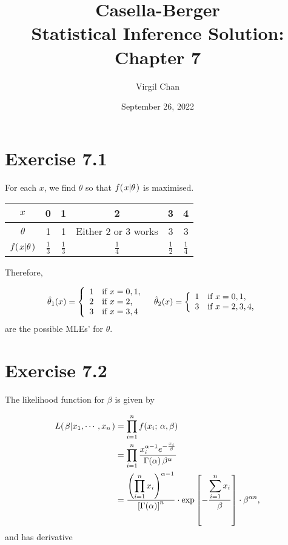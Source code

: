 \documentclass[12pt,letterpaper,reqno]{amsart}
\author{Virgil Chan}
\title{Casella-Berger \\ Statistical Inference Solution: \\ Chapter 7}
\date{September 26, 2022}
\numberwithin{equation}{subsection}
\begin{document}
\maketitle

\tableofcontents

\newpage
\section{Exercise 7.1}

For each $x$, we find $\theta$ so that ${f}\! \left( {\left. {x} \middle| {\theta} \right.} \right)$ is maximised.

\begin{center}
    \begin{tabular}{|c||c|c|c|c|c|}
    \hline
         $x$ & 0 & 1 & 2 & 3 & 4  \\
    \hline
         $\theta$ & 1 & 1 & Either 2 or 3 works & 3 & 3 \\
    \hline
    ${f}\! \left( {\left. {x} \middle| {\theta} \right.} \right)$ & $\frac{1}{3}$ & $\frac{1}{3}$ & $\frac{1}{4}$ & $\frac{1}{2}$ & $\frac{1}{4}$ \\
    \hline
    \end{tabular}
\end{center}
Therefore,

\begin{align*}
    {\hat{\theta}_1}\! \left( {x} \right) &= \left\{ \begin{array}{cl}
        1 & \mbox{if $x = 0, 1$,}\\
        2 & \mbox{if $x = 2$,} \\
        3 & \mbox{if $x =3,4$}
    \end{array} \right.
    & {\hat{\theta}_2}\! \left( {x} \right) &= \left\{ \begin{array}{cl}
        1 & \mbox{if $x = 0, 1$,}\\
        3 & \mbox{if $x =2, 3, 4$,} \\
    \end{array} \right.
\end{align*}
are the possible MLEs' for $\theta$.

\newpage
\section{Exercise 7.2}

The likelihood function for $\beta$ is given by

\begin{align*}
    {L}\! \left( {\left. {\beta} \middle| {x_1, \cdots, x_n} \right.} \right) &= \prod_{i=1}^n {f}\! \left( {x_i \mbox{; } \alpha, \beta} \right) \\
    &= \prod_{i=1}^n \frac{x_i^{\alpha - 1} e^{- \frac{x_i}{\beta}}}{{\Gamma}\! \left( {\alpha} \right) \beta^{\alpha}} \\
    &= \frac{\displaystyle \left( \prod_{i=1}^n x_i \right)^{\alpha - 1}}{\left[{\Gamma}\! \left( {\alpha} \right) \right]^n} \cdot \exp \left[- \frac{\displaystyle \sum_{i=1}^n x_i}{\beta} \right] \cdot \beta^{\alpha n},
\end{align*}
and has derivative
\end{document}
